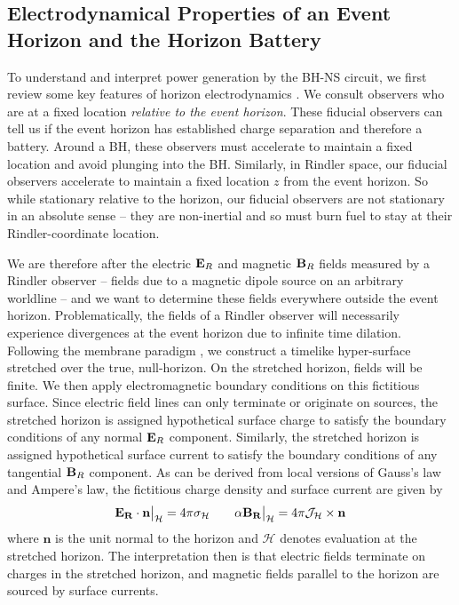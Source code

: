 \subsection{Electrodynamical Properties of an Event Horizon and the Horizon Battery}
\label{Electrodynamical Properties  of an Horizon}

To understand and interpret power generation by the BH-NS circuit, we
first review some key features of horizon electrodynamics \cite{MPBook}. 
We consult observers who are at a fixed
location {\it relative to the event horizon}. These fiducial observers
can tell us if the event horizon has established charge separation and
therefore a battery. 
Around a BH, these observers must
accelerate to maintain a fixed location and avoid plunging into the BH. Similarly, in Rindler space,
our fiducial observers accelerate to maintain a fixed location $z$
from the event horizon. So while stationary relative to the horizon,
our fiducial observers are not stationary in an absolute sense -- they
are non-inertial and so
must burn fuel to stay at their Rindler-coordinate location.

We are therefore after the electric ${\bf E}_R$ and magnetic ${\bf B}_R$ fields
measured by a Rindler observer -- fields due to a magnetic dipole
source on an arbitrary worldline -- and we want to determine these fields
everywhere outside the event horizon. Problematically, the fields
of a Rindler observer will necessarily experience divergences at the
event horizon due to infinite time dilation.
Following the membrane paradigm \cite{MPBook}, we construct a
timelike hyper-surface stretched over the true, null-horizon. On the
stretched horizon, fields will be finite. We then
apply electromagnetic boundary conditions on this fictitious surface. Since
electric field lines can only terminate or originate on sources, the stretched horizon is assigned hypothetical surface charge to
satisfy the boundary conditions of any normal ${\bf E}_R$
component. Similarly, the stretched horizon is assigned hypothetical surface current to
satisfy the boundary conditions of any tangential ${\bf B}_R$
component. As can be derived from local versions of Gauss's law and Ampere's law, the fictitious 
charge density and surface current are given by
\begin{align}
 \mathbf{E_R} \cdot \mathbf{n} \big{|}_{\mathcal{H}} = 4 \pi
 \sigma_{\mathcal{H}}   \qquad \alpha \mathbf{B_R}\big{|}_{\mathcal{H}} = 4 \pi \mathbf{\mathcal{J}_{\mathcal{H}}} \times \mathbf{n}
 \label{EBBCs}
\end{align}
where $\mathbf{n}$ is the unit normal to the horizon and $\mathcal{H}$
denotes evaluation at the stretched horizon. 
The interpretation then is that electric fields terminate on charges
in the stretched horizon, and magnetic fields parallel to the horizon
are sourced by surface currents. 

